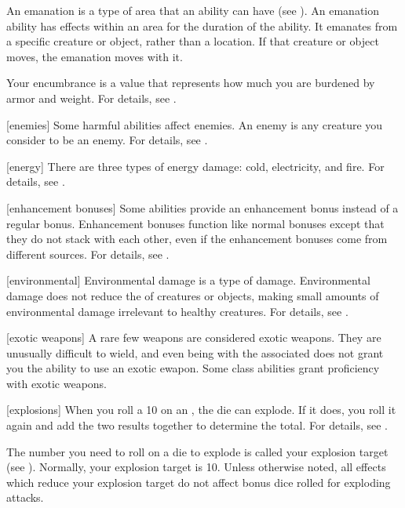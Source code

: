  An emanation is a type of area that an ability can have (see ).
An emanation ability has effects within an area for the duration of the ability.
It emanates from a specific creature or object, rather than a location.
If that creature or object moves, the emanation moves with it.

 Your encumbrance is a value that represents how much you are burdened by armor and weight.
For details, see .

[enemies] Some harmful abilities affect enemies.
An enemy is any creature you consider to be an enemy.
For details, see .

[energy] There are three types of energy damage: cold, electricity, and fire.
For details, see .

[enhancement bonuses] Some abilities provide an enhancement bonus instead of a regular bonus.
Enhancement bonuses function like normal bonuses except that they do not stack with each other, even if the enhancement bonuses come from different sources.
For details, see .

[environmental] Environmental damage is a type of damage.
Environmental damage does not reduce the  of creatures or objects, making small amounts of environmental damage irrelevant to healthy creatures.
For details, see .

[exotic weapons] A rare few weapons are considered exotic weapons.
They are unusually difficult to wield, and even being  with the associated  does not grant you the ability to use an exotic ewapon.
Some class abilities grant proficiency with exotic weapons.

[explosions] When you roll a 10 on an , the die can explode.
If it does, you roll it again and add the two results together to determine the total.
For details, see .

 The number you need to roll on a die to explode is called your explosion target (see ).
Normally, your explosion target is 10.
Unless otherwise noted, all effects which reduce your explosion target do not affect bonus dice rolled for exploding attacks.

